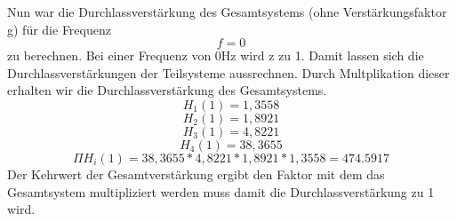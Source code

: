 Nun war die Durchlassverst\"arkung des Gesamtsystems (ohne Verst\"arkungsfaktor g) f\"ur die Frequenz \[f=0\] zu berechnen.
Bei einer Frequenz von 0Hz wird z zu 1. Damit lassen sich die Durchlassverst\"arkungen der Teilsysteme aussrechnen. Durch Multplikation dieser erhalten wir
die Durchlassverst\"arkung des Gesamtsystems.
\begin{equation}
  H_1(1)=1,3558
  \end{equation}
  \begin{equation}
  H_2(1)=1,8921
  \end{equation}
  \begin{equation}
  H_3(1)=4,8221
  \end{equation}
  \begin{equation}
  H_4(1)=38,3655
  \end{equation}
  \begin{equation}
  \Pi H_i(1)=38,3655*4,8221*1,8921*1,3558=474.5917
\end{equation}
Der Kehrwert der Gesamtverst\"arkung ergibt den Faktor mit dem das Gesamtsystem multipliziert werden muss damit die Durchlassverst\"arkung zu 1 wird.
